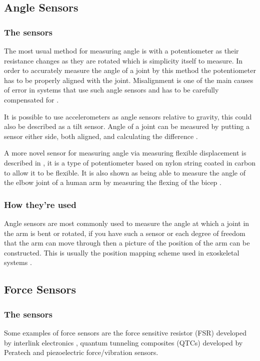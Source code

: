 \documentclass[journal]{IEEEtran}
\begin{document}
\subsection{Angle Sensors} 
\subsubsection{The sensors}
The most usual method for measuring angle is with a potentiometer as their resistance changes as 
they are rotated which is simplicity itself to measure. In order to accurately measure the angle of 
a joint by this method the potentiometer has to be properly aligned with the joint. Misalignment is 
one of the main causes of error in systems that use such angle sensors and has to be carefully 
compensated for \cite{AdvancesPush}.

It is possible to use accelerometers as angle sensors relative to gravity, this could also be described 
as a tilt sensor. Angle of a joint can be measured by putting a sensor either side, both aligned, and 
calculating the difference \cite{ACangle}.

A more novel sensor for measuring angle via measuring flexible displacement is described in \cite{flexiSensor}, 
it is a type of potentiometer based on nylon string coated in carbon to allow it to be flexible. It is also shown as 
being able to measure the angle of the elbow joint of a human arm by measuring the flexing of the bicep \cite{flexiSensor}.

\subsubsection{How they're used}
Angle sensors are most commonly used to measure the angle at which a joint in the arm is bent or 
rotated, if you have such a sensor or each degree of freedom that the arm can move through then a 
picture of the position of the arm can be constructed. This is usually the position mapping scheme 
used in exoskeletal systems \cite{AdvancesPush}.

\subsection{Force Sensors}
\subsubsection{The sensors}
Some examples of force sensors are the force sensitive resistor (FSR) developed by interlink 
electronics \cite{FSR,Interlink}, quantum tunneling composites (QTCs) developed by Peratech \cite{QTCs} and 
piezoelectric force/vibration sensors.
\end{document}
